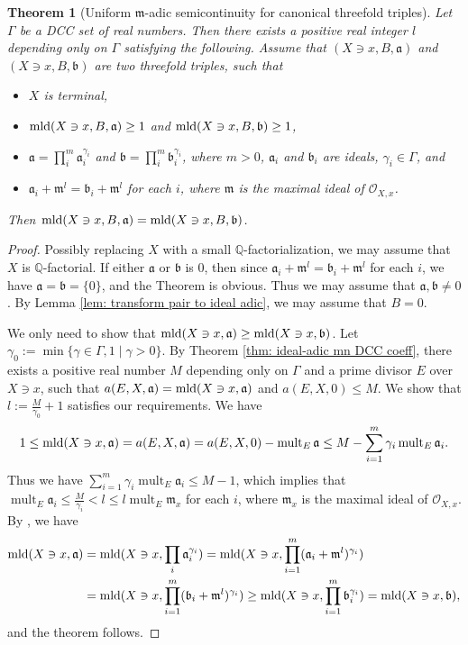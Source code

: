 \documentclass[11pt]{amsart}
\numberwithin{equation}{section}
\newcommand{\Qq}{\mathbb{Q}}
\newcommand{\aaa}{\mathfrak{a}}
\newcommand{\bbb}{\mathfrak{b}}
\newcommand{\mmm}{\mathfrak{m}}
\newcommand{\mld}{{\rm{mld}}}
\newcommand{\mult}{\operatorname{mult}}
\newcommand{\Ii}{{\Gamma}}
\newtheorem{thm}{Theorem}[section]
\theoremstyle{definition}
\theoremstyle{definition}
\begin{document}
\begin{thm}[Uniform $\mmm$-adic semicontinuity for canonical threefold triples]\label{thm: ideal adic semicontinuity termial threefolds}
Let $\Ii$ be a DCC set of real numbers. Then there exists a positive real integer $l$ depending only on $\Ii$ satisfying the following. Assume that $(X\ni x,B,\aaa)$ and $(X\ni x,B,\bbb)$ are two threefold triples, such that
\begin{itemize}
    \item $X$ is terminal,
    \item $\mld(X\ni x,B,\aaa)\geq 1$ and $\mld(X\ni x,B,\bbb)\geq 1$,
\item $\aaa=\prod^m_i\aaa_i^{\gamma_i}$ and $\bbb=\prod^m_i\bbb_i^{\gamma_i}$, where $m>0$, $\aaa_i$ and $\bbb_i$ are ideals, $\gamma_i\in\Ii$, and
    \item $\aaa_i+\mmm^l=\bbb_i+\mmm^l$ for each $i$, where $\mmm$ is the maximal ideal of $\mathcal{O}_{X,x}$.
\end{itemize}
Then $\mld(X\ni x,B,\aaa)=\mld(X\ni x,B,\bbb)$.
\end{thm}
\begin{proof}
Possibly replacing $X$ with a small $\Qq$-factorialization, we may assume that $X$ is $\Qq$-factorial. If either $\aaa$ or $\bbb$ is $\mathfrak{0}$, then since $\aaa_i+\mmm^l=\bbb_i+\mmm^l$ for each $i$, we have $\aaa=\bbb=\{0\}$, and the Theorem is obvious. Thus we may assume that $\aaa,\bbb\not=\mathfrak{0}$. By Lemma \ref{lem: transform pair to ideal adic}, we may assume that $B=0$.

We only need to show that $\mld(X\ni x,\aaa)\geq\mld(X\ni x,\bbb)$. Let $\gamma_0:=\min\{\gamma\in\Ii, 1\mid \gamma>0\}$. By Theorem \ref{thm: ideal-adic mn DCC coeff}, there exists a positive real number $M$ depending only on $\Ii$ and a prime divisor $E$ over $X\ni x$, such that $a(E,X,\aaa)=\mld(X\ni x,\aaa)$ and $a(E,X,0)\leq M$. We show that $l:=\frac{M}{\gamma_0}+1$ satisfies our requirements. We have
$$1\leq\mld(X\ni x,\aaa)=a(E,X,\aaa)=a(E,X,0)-\mult_E\aaa\leq M-\sum_{i=1}^m\gamma_i\mult_E\aaa_i.$$
Thus we have $\sum_{i=1}^m\gamma_i\mult_E\aaa_i\leq M-1$, which implies that $\mult_{E}\aaa_i\leq\frac{M}{\gamma_i}<l\leq l\mult_E\mmm_x$ for each $i$, where $\mmm_x$ is the maximal ideal of $\mathcal{O}_{X,x}$. By \cite[Proposition 2.2 iv)]{MN18}, we have
\begin{align*}
    \mld(X\ni x,\aaa)&=\mld(X\ni x,\prod_i\aaa_i^{\gamma_i})=\mld(X\ni x,\prod_{i=1}^m(\aaa_i+\mmm^l)^{\gamma_i})\\
    &=\mld(X\ni x,\prod_{i=1}^m(\bbb_i+\mmm^l)^{\gamma_i})\geq\mld(X\ni x,\prod_{i=1}^m\bbb_i^{\gamma_i})=\mld(X\ni x,\bbb),
\end{align*}
and the theorem follows.
\end{proof}
\end{document}
